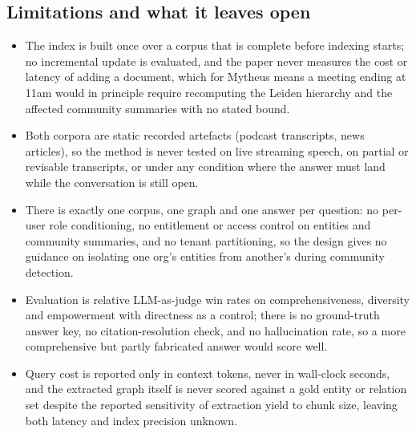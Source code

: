 \subsection{Limitations and what it leaves open}
\begin{itemize}[leftmargin=1.2em, itemsep=1pt, topsep=2pt]
  \item The index is built once over a corpus that is complete before indexing starts; no incremental update is evaluated, and the paper never measures the cost or latency of adding a document, which for Mytheus means a meeting ending at 11am would in principle require recomputing the Leiden hierarchy and the affected community summaries with no stated bound.
  \item Both corpora are static recorded artefacts (podcast transcripts, news articles), so the method is never tested on live streaming speech, on partial or revisable transcripts, or under any condition where the answer must land while the conversation is still open.
  \item There is exactly one corpus, one graph and one answer per question: no per-user role conditioning, no entitlement or access control on entities and community summaries, and no tenant partitioning, so the design gives no guidance on isolating one org's entities from another's during community detection.
  \item Evaluation is relative LLM-as-judge win rates on comprehensiveness, diversity and empowerment with directness as a control; there is no ground-truth answer key, no citation-resolution check, and no hallucination rate, so a more comprehensive but partly fabricated answer would score well.
  \item Query cost is reported only in context tokens, never in wall-clock seconds, and the extracted graph itself is never scored against a gold entity or relation set despite the reported sensitivity of extraction yield to chunk size, leaving both latency and index precision unknown.
\end{itemize}
